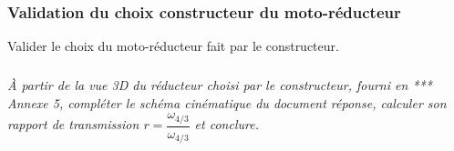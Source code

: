 \documentclass[10pt,fleqn]{article} %
\begin{document}
\begin{multicols}{2}
\subsubsection*{Validation du choix constructeur du moto-réducteur}
\begin{obj}
Valider le choix du moto-réducteur fait par le constructeur.
\end{obj}

\subparagraph{}\textit{À partir de la vue 3D du réducteur choisi par le constructeur, fourni en *** Annexe 5, compléter le schéma cinématique du document réponse, calculer son rapport de transmission $r = \dfrac{\omega_{4/3}}{\omega_{4/3}}$ et conclure.}
\ifprof
\begin{corrige}~\\
\end{corrige}
\else
\fi



\end{multicols}
\end{document}
